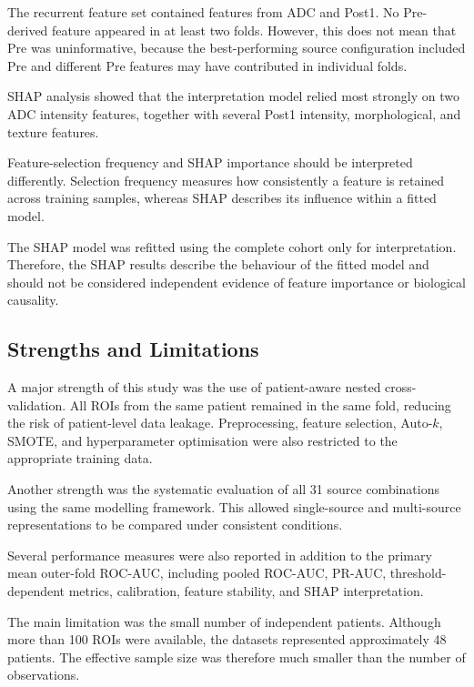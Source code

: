 \documentclass[12pt,twocolumn]{article}
\begin{document}
The recurrent feature set contained features from ADC and Post1. No
Pre-derived feature appeared in at least two folds. However, this does
not mean that Pre was uninformative, because the best-performing source
configuration included Pre and different Pre features may have
contributed in individual folds.

SHAP analysis showed that the interpretation model relied most strongly
on two ADC intensity features, together with several Post1 intensity,
morphological, and texture features.

Feature-selection frequency and SHAP importance should be interpreted
differently. Selection frequency measures how consistently a feature
is retained across training samples, whereas SHAP describes its
influence within a fitted model.

The SHAP model was refitted using the complete cohort only for
interpretation. Therefore, the SHAP results describe the behaviour of
the fitted model and should not be considered independent evidence of
feature importance or biological causality.


\subsection{Strengths and Limitations}
\label{subsec:discussion_strengths_limitations}

A major strength of this study was the use of patient-aware nested
cross-validation. All ROIs from the same patient remained in the same
fold, reducing the risk of patient-level data leakage. Preprocessing,
feature selection, Auto-\(k\), SMOTE, and hyperparameter optimisation
were also restricted to the appropriate training data.

Another strength was the systematic evaluation of all 31 source
combinations using the same modelling framework. This allowed
single-source and multi-source representations to be compared under
consistent conditions.

Several performance measures were also reported in addition to the
primary mean outer-fold ROC-AUC, including pooled ROC-AUC, PR-AUC,
threshold-dependent metrics, calibration, feature stability, and SHAP
interpretation.

The main limitation was the small number of independent patients.
Although more than 100 ROIs were available, the datasets represented
approximately 48 patients. The effective sample size was therefore much
smaller than the number of observations.
\end{document}
